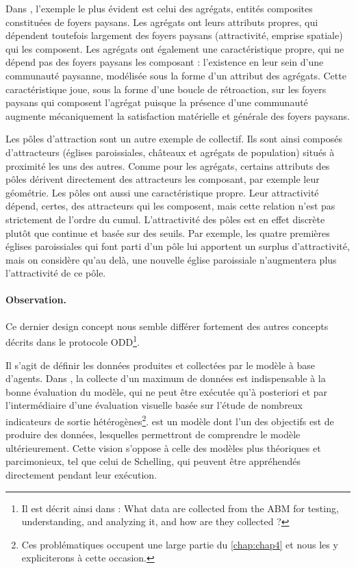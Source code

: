 Dans \simfeodal{}, l'exemple le plus évident est celui des agrégats, entités composites constituées de foyers paysans.
Les agrégats ont leurs attributs propres, qui dépendent toutefois largement des foyers paysans (attractivité, emprise spatiale) qui les composent.
Les agrégats ont également une caractéristique propre, qui ne dépend pas des foyers paysans les composant : l'existence en leur sein d'une communauté paysanne, modélisée sous la forme d'un attribut des agrégats.
Cette caractéristique joue, sous la forme d'une boucle de rétroaction, sur les foyers paysans qui composent l'agrégat puisque la présence d'une communauté augmente mécaniquement la satisfaction matérielle et générale des foyers paysans.

Les pôles d'attraction sont un autre exemple de collectif.
Ils sont ainsi composés d'attracteurs (églises paroissiales, châteaux et agrégats de population) situés à proximité les uns des autres.
Comme pour les agrégats, certains attributs des pôles dérivent directement des attracteurs les composant, par exemple leur géométrie.
Les pôles ont aussi une caractéristique propre.
Leur attractivité dépend, certes, des attracteurs qui les composent, mais cette relation n'est pas strictement de l'ordre du cumul.
L'attractivité des pôles est en effet discrète plutôt que continue et basée sur des seuils.
Par exemple, les quatre premières églises paroissiales qui font parti d'un pôle lui apportent un surplus d'attractivité, mais on considère qu'au delà, une nouvelle église paroissiale n'augmentera plus l'attractivité de ce pôle.


\paragraph{Observation.} Ce dernier \og design concept\fg{} nous semble différer fortement des autres concepts décrits dans le protocole ODD\footnote{
Il est décrit ainsi dans \textcite[354]{grimm_documenting_2017} :
\og What data are collected from the ABM for testing, understanding, and analyzing it, and how are they collected ? \fg{}
}.

Il s'agit de définir les données produites et collectées par le modèle à base d'agents.
Dans \simfeodal{}, la collecte d'un maximum de données est indispensable à la bonne évaluation du modèle, qui ne peut être exécutée qu'à posteriori et par l'intermédiaire d'une \og évaluation visuelle\fg{} basée sur l'étude de nombreux indicateurs de sortie hétérogènes\footnote{
	Ces problématiques occupent une large partie du \cref{chap:chap4} et nous les y expliciterons à cette occasion.
}.
\simfeodal{} est un modèle dont l'un des objectifs est de produire des données, lesquelles permettront de comprendre le modèle ultérieurement.
Cette vision s'oppose à celle des modèles plus théoriques et parcimonieux, tel que celui de Schelling, qui peuvent être appréhendés directement pendant leur exécution. 

